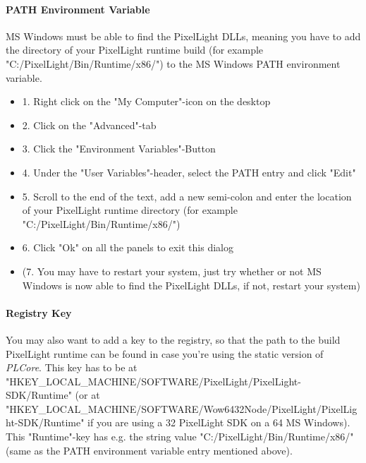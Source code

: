 \paragraph{PATH Environment Variable}
\ac{MS} Windows must be able to find the PixelLight \ac{DLL}s, meaning you have to add the directory of your PixelLight runtime build (for example "C:/PixelLight/Bin/Runtime/x86/") to the \ac{MS} Windows PATH environment variable.
\begin{itemize}
\item{1. Right click on the "My Computer"-icon on the desktop}
\item{2. Click on the "Advanced"-tab}
\item{3. Click the "Environment Variables"-Button}
\item{4. Under the "User Variables"-header, select the PATH entry and click "Edit"}
\item{5. Scroll to the end of the text, add a new semi-colon and enter the location of your PixelLight runtime directory (for example "C:/PixelLight/Bin/Runtime/x86/")}
\item{6. Click "Ok" on all the panels to exit this dialog}
\item{(7. You may have to restart your system, just try whether or not \ac{MS} Windows is now able to find the PixelLight \ac{DLL}s, if not, restart your system)}
\end{itemize}


\paragraph{Registry Key}
You may also want to add a key to the registry, so that the path to the build PixelLight runtime can be found in case you're using the static version of \emph{PLCore}. This key has to be at "HKEY\_LOCAL\_MACHINE/SOFTWARE/PixelLight/PixelLight-SDK/Runtime" (or at "HKEY\_LOCAL\_MACHINE/SOFTWARE/Wow6432Node/PixelLight/PixelLight-SDK/Runtime" if you are using a \SI{32}{\bit} PixelLight SDK on a \SI{64}{\bit} \ac{MS} Windows). This "Runtime"-key has e.g. the string value "C:/PixelLight/Bin/Runtime/x86/" (same as the PATH environment variable entry mentioned above).
